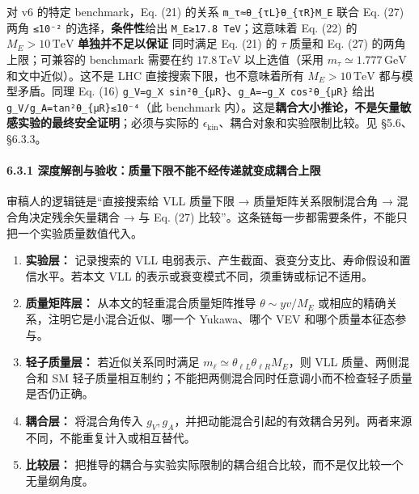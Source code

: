 \documentclass[
]{article}
\providecommand{\tightlist}{%
  \setlength{\itemsep}{0pt}\setlength{\parskip}{0pt}}
\begin{document}
对 v6 的特定 benchmark，Eq. (21) 的关系
\texttt{m\_τ≈θ\_\{τL\}θ\_\{τR\}M\_E} 联合 Eq. (27) 两角 \texttt{≤10⁻²}
的选择，\textbf{条件性}给出 \texttt{M\_E≳17.8\ TeV}；这意味着 Eq. (22)
的 \(M_E>10\,\mathrm{TeV}\) \textbf{单独并不足以保证} 同时满足 Eq. (21)
的 \(\tau\) 质量和 Eq. (27) 的两角上限；可兼容的 benchmark 需要在约
\(17.8\,\mathrm{TeV}\) 以上选值（采用
\(m_\tau\simeq1.777\,\mathrm{GeV}\) 和文中近似）。这不是 LHC
直接搜索下限，也不意味着所有 \(M_E>10\,\mathrm{TeV}\) 都与模型矛盾。同理
Eq. (16)
\texttt{g\_V=g\_X\ sin²θ\_\{μR\}}、\texttt{g\_A=−g\_X\ cos²θ\_\{μR\}}
给出 \texttt{\textbar{}g\_V/g\_A\textbar{}=tan²θ\_\{μR\}≲10⁻⁴}（此
benchmark
内）。这是\textbf{耦合大小推论，不是矢量敏感实验的最终安全证明}；必须与实际的
\(\epsilon_{\mathrm{kin}}\)、耦合对象和实验限制比较。见 §5.6、§6.3.3。

\paragraph{6.3.1
深度解剖与验收：质量下限不能不经传递就变成耦合上限}\label{ux6df1ux5ea6ux89e3ux5256ux4e0eux9a8cux6536ux8d28ux91cfux4e0bux9650ux4e0dux80fdux4e0dux7ecfux4f20ux9012ux5c31ux53d8ux6210ux8026ux5408ux4e0aux9650}

审稿人的逻辑链是``直接搜索给 VLL 质量下限 → 质量矩阵关系限制混合角 →
混合角决定残余矢量耦合 → 与 Eq. (27)
比较''。这条链每一步都需要条件，不能只把一个实验质量数值代入。

\begin{enumerate}
\def\labelenumi{\arabic{enumi}.}
\tightlist
\item
  \textbf{实验层：} 记录搜索的 VLL
  电弱表示、产生截面、衰变分支比、寿命假设和置信水平。若本文 VLL
  的表示或衰变模式不同，须重铸或标记不适用。
\item
  \textbf{质量矩阵层：} 从本文的轻重混合质量矩阵推导
  \(\theta\sim yv/M_E\) 或相应的精确关系，注明它是小混合近似、哪一个
  Yukawa、哪个 VEV 和哪个质量本征态参与。
\item
  \textbf{轻子质量层：} 若近似关系同时满足
  \(m_\ell\simeq\theta_{\ell L}\theta_{\ell R}M_E\)，则 VLL
  质量、两侧混合和 SM
  轻子质量相互制约；不能把两侧混合同时任意调小而不检查轻子质量是否仍正确。
\item
  \textbf{耦合层：} 将混合角传入
  \(g_V,g_A\)，并把动能混合引起的有效耦合另列。两者来源不同，不能重复计入或相互替代。
\item
  \textbf{比较层：}
  把推导的耦合与实验实际限制的耦合组合比较，而不是仅比较一个无量纲角度。
\end{enumerate}
\end{document}
